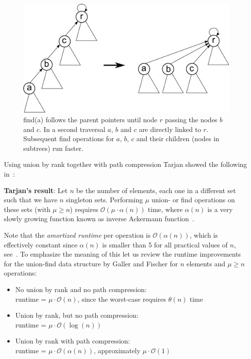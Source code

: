 \documentclass[a4paper,12pt, titlepage]{article}  %
\newcommand{\oh}{\mathcal{O}}   %
\begin{document}
\begin{figure}[ht]
	\centering
	\includegraphics[scale=0.4]{./figures/gallerFischer_pathCompression.pdf}
	\caption{find(a) follows the parent pointers until node $r$ passing the nodes $b$ and $c$.
	         In a second traversal $a$, $b$ and $c$ are directly linked to $r$. Subsequent find 
	         operations for $a$, $b$, $c$ and their children (nodes in subtrees) run faster.}
	\label{fig:gallerFischer_pathCompression}
\end{figure}

Using union by rank together with path compression Tarjan showed the following 
in~\cite{tarjan_golumbic, tarjan83, tarjan75}: 

\textbf{Tarjan's result}: Let $n$ be the number of elements, each one in a 
different set such that we have $n$ singleton sets. Performing $\mu$ union- or find operations 
on these sets (with $\mu \geq n$) requires $\mathcal{O}(\mu \cdot \alpha(n))$ time, where $\alpha(n)$ is a very
slowly growing function known as inverse Ackermann function~\cite{inverse_ackermannFunction}. 

Note that the \emph{amortized runtime} per operation is $\mathcal{O}(\alpha(n))$, which is effectively 
constant since $\alpha(n)$ is smaller than 5 for all practical values of $n$, see~\cite{jeffe}. 
 To emphasize the meaning of this
let us review the runtime improvements for the union-find data structure by Galler and Fischer for $n$ elements
and $\mu \geq n$ operations:

\begin{itemize}
	\item No union by rank and no path compression: \\
		runtime = $\mu \cdot \mathcal{O}(n)$, since the worst-case requires $\theta(n)$ time
	\item Union by rank, but no path compression: \\
	  runtime = $\mu \cdot \mathcal{O}(\log(n))$
	\item Union by rank with path compression: \\
	  runtime = $\mu \cdot \mathcal{O}(\alpha(n))$, approximately $\mu \cdot \oh(1)$
\end{itemize}
\end{document}
